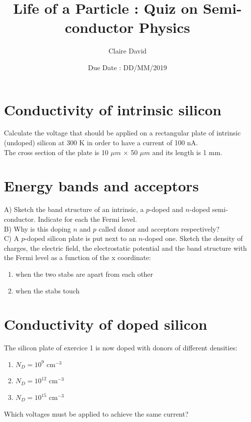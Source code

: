\documentclass[12pt]{article}
\title{Life of a Particle : Quiz on Semi-conductor Physics}
\author{Claire David}
\date{Due Date : DD/MM/2019}
\begin{document}
\maketitle

\section{Conductivity of intrinsic silicon}
Calculate the voltage that should be applied on a rectangular plate of intrinsic (undoped) silicon at 300 K in order to have a current of 100 nA.\\
The cross section of the plate is 10 $\mu m$ $\times$ 50 $\mu m$ and its length is 1 mm.

\section{Energy bands and acceptors}
A) Sketch the band structure of an intrinsic, a $p$-doped and $n$-doped semi-conductor. Indicate for each the Fermi level.\\

B) Why is this doping $n$ and $p$ called donor and acceptors respectively?\\

C) A $p$-doped silicon plate is put next to an $n$-doped one. Sketch the density of charges, the electric field, the electrostatic potential and the band structure with the Fermi level as a function of the x coordinate:
\begin{enumerate}
 \item when the two stabs are apart from each other
 \item when the stabs touch
\end{enumerate}

\section{Conductivity of doped silicon}
The silicon plate of exercice 1 is now doped with donors of different densities:
\begin{enumerate}
 \item $N_D = 10^9$ cm$^{-3}$
 \item $N_D = 10^12$ cm$^{-3}$
 \item $N_D = 10^15$ cm$^{-3}$
\end{enumerate}

Which voltages must be applied to achieve the same current?






    
\end{document}
